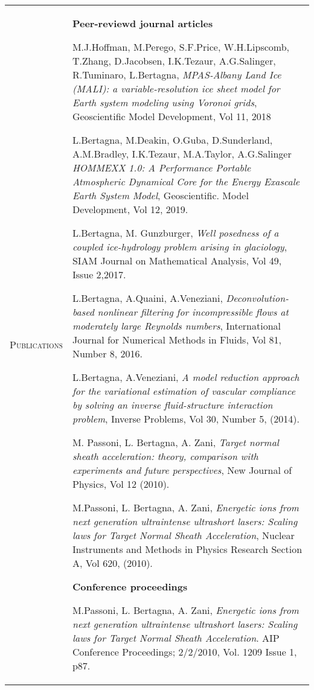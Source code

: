 \documentclass[10pt]{article}
\begin{document}
\newpage
\begin{tabular}{p{2.5cm}|p{15.5cm}}
\textsc{Publications} & \textbf{Peer-reviewd journal articles}
\vspace*{0.2cm}

M.J.Hoffman, M.Perego, S.F.Price, W.H.Lipscomb, T.Zhang, D.Jacobsen, I.K.Tezaur, A.G.Salinger, R.Tuminaro, L.Bertagna, \textit{MPAS-Albany Land Ice (MALI): a variable-resolution ice sheet model for Earth system modeling using Voronoi grids}, Geoscientific Model Development, Vol 11, 2018

L.Bertagna, M.Deakin, O.Guba, D.Sunderland, A.M.Bradley, I.K.Tezaur, M.A.Taylor, A.G.Salinger \textit{HOMMEXX 1.0: A Performance Portable Atmospheric Dynamical Core for the Energy Exascale Earth System Model}, Geoscientific. Model Development, Vol 12, 2019.
\vspace*{0.2cm}

L.Bertagna, M. Gunzburger, \textit{Well posedness of a coupled ice-hydrology problem arising in glaciology}, SIAM Journal on Mathematical Analysis, Vol 49, Issue 2,2017.
\vspace*{0.2cm}

L.Bertagna, A.Quaini, A.Veneziani, \textit{Deconvolution-based nonlinear filtering for incompressible flows at moderately large Reynolds numbers}, International Journal for Numerical Methods in Fluids, Vol 81, Number 8, 2016.
\vspace*{0.2cm}

L.Bertagna, A.Veneziani, \textit{A model reduction approach for the variational estimation of vascular compliance by solving an inverse fluid-structure interaction problem}, Inverse Problems, Vol 30, Number 5, (2014).
\vspace*{0.2cm}

M. Passoni, L. Bertagna, A. Zani, \textit{Target normal sheath acceleration: theory, comparison with experiments and future perspectives}, New Journal of Physics, Vol 12 (2010).
\vspace*{0.2cm}

M.Passoni, L. Bertagna, A. Zani, \textit{Energetic ions from next generation ultraintense ultrashort lasers: Scaling laws for Target Normal Sheath Acceleration}, Nuclear Instruments and Methods in Physics Research Section A, Vol 620, (2010).
\vspace*{0.2cm}

\textbf{Conference proceedings}

\vspace*{0.2cm}
M.Passoni, L. Bertagna, A. Zani, \textit{Energetic ions from next generation ultraintense ultrashort lasers: Scaling laws for Target Normal Sheath Acceleration}. AIP Conference Proceedings; 2/2/2010, Vol. 1209 Issue 1, p87.


\end{tabular}
\end{document}

